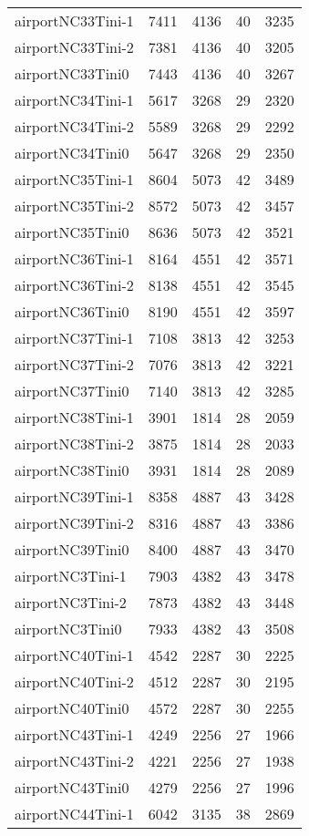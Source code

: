\begin{longtable}{lrrrr}
airportNC33Tini-1 & 7411 & 4136 & 40 & 3235 \\
airportNC33Tini-2 & 7381 & 4136 & 40 & 3205 \\
airportNC33Tini0 & 7443 & 4136 & 40 & 3267 \\
airportNC34Tini-1 & 5617 & 3268 & 29 & 2320 \\
airportNC34Tini-2 & 5589 & 3268 & 29 & 2292 \\
airportNC34Tini0 & 5647 & 3268 & 29 & 2350 \\
airportNC35Tini-1 & 8604 & 5073 & 42 & 3489 \\
airportNC35Tini-2 & 8572 & 5073 & 42 & 3457 \\
airportNC35Tini0 & 8636 & 5073 & 42 & 3521 \\
airportNC36Tini-1 & 8164 & 4551 & 42 & 3571 \\
airportNC36Tini-2 & 8138 & 4551 & 42 & 3545 \\
airportNC36Tini0 & 8190 & 4551 & 42 & 3597 \\
airportNC37Tini-1 & 7108 & 3813 & 42 & 3253 \\
airportNC37Tini-2 & 7076 & 3813 & 42 & 3221 \\
airportNC37Tini0 & 7140 & 3813 & 42 & 3285 \\
airportNC38Tini-1 & 3901 & 1814 & 28 & 2059 \\
airportNC38Tini-2 & 3875 & 1814 & 28 & 2033 \\
airportNC38Tini0 & 3931 & 1814 & 28 & 2089 \\
airportNC39Tini-1 & 8358 & 4887 & 43 & 3428 \\
airportNC39Tini-2 & 8316 & 4887 & 43 & 3386 \\
airportNC39Tini0 & 8400 & 4887 & 43 & 3470 \\
airportNC3Tini-1 & 7903 & 4382 & 43 & 3478 \\
airportNC3Tini-2 & 7873 & 4382 & 43 & 3448 \\
airportNC3Tini0 & 7933 & 4382 & 43 & 3508 \\
airportNC40Tini-1 & 4542 & 2287 & 30 & 2225 \\
airportNC40Tini-2 & 4512 & 2287 & 30 & 2195 \\
airportNC40Tini0 & 4572 & 2287 & 30 & 2255 \\
airportNC43Tini-1 & 4249 & 2256 & 27 & 1966 \\
airportNC43Tini-2 & 4221 & 2256 & 27 & 1938 \\
airportNC43Tini0 & 4279 & 2256 & 27 & 1996 \\
airportNC44Tini-1 & 6042 & 3135 & 38 & 2869 \\

\end{longtable}

